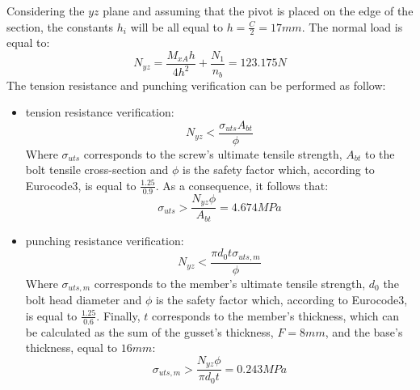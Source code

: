 Considering the $yz$ plane and assuming that the pivot is placed on the edge of the section, the constants $h_{i}$ will be all equal to $h = \frac{C}{2} = 17 mm$.
The normal load is equal to:
\begin{equation*}
    N_{yz} = \frac{M_{xA}h}{4h^{2}} + \frac{N_{1}}{n_{b}} = 123.175 N
\end{equation*}
The tension resistance and punching verification can be performed as follow:
\begin{itemize}
    \item tension resistance verification:
    \begin{equation*}
        N_{yz} < \frac{\sigma_{uts}A_{bt}}{\phi}
    \end{equation*}
    Where $\sigma_{uts}$ corresponds to the screw's ultimate tensile strength, $A_{bt}$ to the bolt tensile cross-section and $\phi$ is the safety factor which, according to Eurocode3, is equal to $\frac{1.25}{0.9}$. As a consequence, it follows that:
    \begin{equation*}
       \sigma_{uts} > \frac{N_{yz}\phi}{A_{bt}} = 4.674MPa
    \end{equation*}
    \item punching resistance verification:
    \begin{equation*}
        N_{yz} < \frac{\pi d_{0} t \sigma_{uts,m}}{\phi}
    \end{equation*}
    Where $\sigma_{uts,m}$ corresponds to the member's ultimate tensile strength, $d_{0}$ the bolt head diameter and $\phi$ is the safety factor which, according to Eurocode3, is equal to $\frac{1.25}{0.6}$. Finally, $t$ corresponds to the member's thickness, which can be calculated as the sum of the gusset's thickness, $F = 8 mm$, and the base's thickness, equal to $16 mm$:
     \begin{equation*}
       \sigma_{uts,m} > \frac{N_{yz}\phi}{\pi d_{0}t} = 0.243 MPa
    \end{equation*}
\end{itemize}

